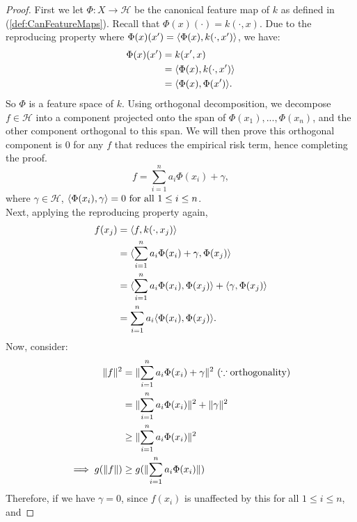 \documentclass[twoside]{memoir}
\begin{document}
	\begin{proof}
		First we let $\Phi: X \rightarrow \mathcal{H}$ be the canonical feature map of $k$ as defined in (\ref{def:CanFeatureMaps}). Recall that $\Phi(x)(\cdot) = k(\cdot , x)$. Due to the reproducing property where $\Phi(x)(x') = \langle\Phi(x), k(\cdot, x')\rangle$, we have:
		\begin{equation*}
		\begin{split}
		\Phi(x)(x') &= k(x', x) \\
		&= \langle\Phi(x), k(\cdot, x')\rangle \\
		&= \langle\Phi(x), \Phi(x')\rangle. 
		\end{split}
		\end{equation*}
		So $\Phi$ is a feature space of $k$. Using orthogonal decomposition, we decompose $f \in \mathcal{H}$ into a component projected onto the span of ${\Phi(x_1), ..., \Phi(x_n)}$, and the other component orthogonal to this span. We will then prove this orthogonal component is $0$ for any $f$ that reduces the empirical risk  term, hence completing the proof.
		\[ f = \sum_{i=1}^{n} a_i \Phi(x_i) + \gamma, \]
		where $\gamma \in \mathcal{H}$, $\langle\Phi(x_i), \gamma\rangle = 0 \text{ for all } 1\leq i\leq n$.\\
		Next, applying the reproducing property again,
		\begin{equation*}
		\begin{split}
		f(x_j) &= \langle f, k(\cdot, x_j)\rangle \\
		&= \langle\sum_{i=1}^{n} a_i \Phi(x_i) + \gamma, \Phi(x_j)\rangle \\
		&= \langle\sum_{i=1}^{n} a_i \Phi(x_i),  \Phi(x_j)\rangle + \langle\gamma,  \Phi(x_j)\rangle \\
		&= \sum_{i=1}^{n} a_i \langle\Phi(x_i),  \Phi(x_j)\rangle.
		\end{split}
		\end{equation*}
		Now, consider:
		\begin{equation*}
		\begin{split}
		\lVert f\rVert^2 &= \lVert\sum_{i=1}^{n} a_i \Phi(x_i) + \gamma\rVert^2 ~ (\because \text{orthogonality})\\
		&=  \lVert\sum_{i=1}^{n} a_i \Phi(x_i)\rVert^2 + \lVert\gamma\rVert^2 \\
		&\geq \lVert\sum_{i=1}^{n} a_i \Phi(x_i)\rVert^2 \\
		\implies g(\lVert f\rVert) &\geq g(\lVert\sum_{i=1}^{n} a_i \Phi(x_i)\rVert)
		\end{split}
		\end{equation*}
		Therefore, if we have $\gamma = 0$, since $f(x_i)$ is unaffected by this for all $1\leq i\leq n$, and  

\end{proof}
\end{document}
